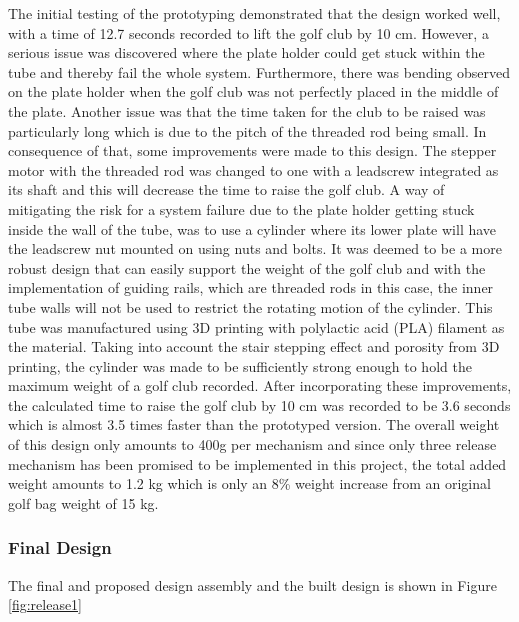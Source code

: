 \documentclass[11pt,landscape]{article}
\begin{document}
\begin{multicols}{2}
    The initial testing of the prototyping demonstrated that the design worked
    well, with a time of 12.7 seconds recorded to lift the golf club by 10 cm.
    However, a serious issue was discovered where the plate holder could get stuck
    within the tube and thereby fail the whole system. Furthermore, there was
    bending observed on the plate holder when the golf club was not perfectly
    placed in the middle of the plate. Another issue was that the time taken for
    the club to be raised was particularly long which is due to the pitch of the
    threaded rod being small. In consequence of that, some improvements were
    made to this design. The stepper motor with the threaded rod was changed to
    one with a leadscrew integrated as its shaft and this will decrease the time
    to raise the golf club.  A way of mitigating the risk for a system failure
    due to the plate holder getting stuck inside the wall of the tube, was to
    use a cylinder where its lower plate will have the leadscrew nut mounted on
    using nuts and bolts. It was deemed to be a more robust design that can
    easily support the weight of the golf club and with the implementation of
    guiding rails, which are threaded rods in this case, the inner tube walls
    will not be used to restrict the rotating motion of the cylinder. This tube
    was manufactured using 3D printing with polylactic acid (PLA) filament as
    the material. Taking into account the stair stepping effect and porosity
    from 3D printing, the cylinder was made to be sufficiently strong enough to
    hold the maximum weight of a golf club recorded. After incorporating these
    improvements, the calculated time to raise the golf club by 10 cm was
    recorded to be 3.6 seconds which is almost 3.5 times faster than the
    prototyped version. The overall weight of this design only amounts to 400g
    per mechanism and since only three release mechanism has been promised to be
    implemented in this project, the total added weight amounts to 1.2 kg which
    is only an 8\% weight increase from an original golf bag weight of 15 kg. 
    
    
    \subsubsection{Final Design}
    The final and proposed design assembly and the built design is shown in
    Figure \ref{fig:release1}
    

\end{multicols}
\end{document}
